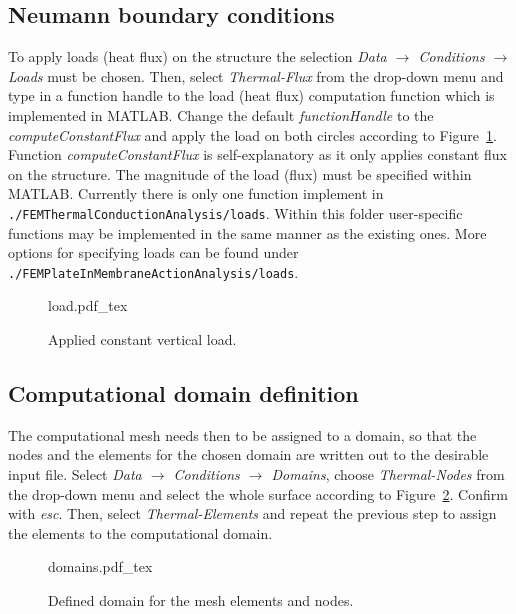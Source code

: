 \documentclass[10pt,a4paper]{article}
\begin{document}
\subsection{Neumann boundary conditions}

To apply loads (heat flux) on the structure the selection \textit{Data $\rightarrow$ Conditions $\rightarrow$ Loads} must be chosen. Then, select \textit{Thermal-Flux} from the drop-down menu and type in a function handle to the load (heat flux) computation function which is implemented in MATLAB. Change the default \textit{functionHandle} to the \textit{computeConstantFlux} and apply the load on both circles according to Figure~\ref{im:load}. \\

Function \textit{computeConstantFlux} is self-explanatory as it only applies constant flux on the structure. The magnitude of the load (flux) must be specified within MATLAB. Currently there is only one function implement in \verb+./FEMThermalConductionAnalysis/loads+. Within this folder user-specific functions may be implemented in the same manner as the existing ones. More options for specifying loads can be found under \verb+./FEMPlateInMembraneActionAnalysis/loads+.

\begin{figure}[ht]
	\centering
	\footnotesize
    \def\svgwidth{0.9\textwidth}{load.pdf_tex}
	\caption{Applied constant vertical load.}
	\label{im:load}
\end{figure}


\subsection{Computational domain definition}

The computational mesh needs then to be assigned to a domain, so that the nodes and the elements for the chosen domain are written out to the desirable input file. Select \textit{Data $\rightarrow$ Conditions $\rightarrow$ Domains}, choose \textit{Thermal-Nodes} from the drop-down menu and select the whole surface according to Figure~\ref{im:domains}. Confirm with \textit{esc}. Then, select \textit{Thermal-Elements} and repeat the previous step to assign the elements to the computational domain.

\begin{figure}[ht]
	\centering
	\footnotesize
    \def\svgwidth{0.9\textwidth}{domains.pdf_tex}
	\caption{Defined domain for the mesh elements and nodes.}
	\label{im:domains}
\end{figure}
\end{document}

